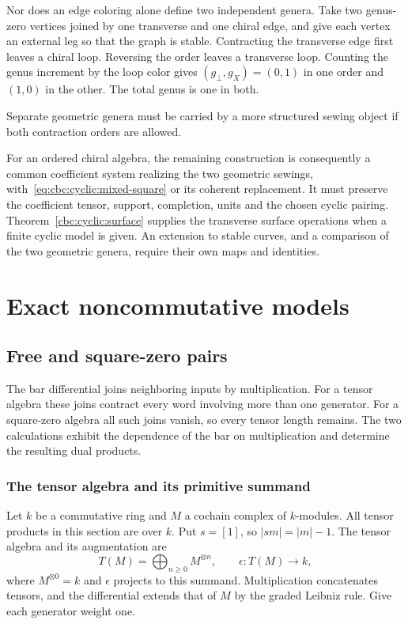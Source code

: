 Nor does an edge coloring alone define two independent genera.
Take two genus-zero vertices joined by one transverse and one chiral edge, and give each vertex an external leg so that the graph is stable.
Contracting the transverse edge first leaves a chiral loop.
Reversing the order leaves a transverse loop.
Counting the genus increment by the loop color gives $(g_\perp,g_X)=(0,1)$ in one order and $(1,0)$ in the other.
The total genus is one in both.

Separate geometric genera must be carried by a more structured sewing object if both contraction orders are allowed.

For an ordered chiral algebra, the remaining construction is consequently a common coefficient system realizing the two geometric sewings, with~\eqref{eq:cbc:cyclic:mixed-square} or its coherent replacement.
It must preserve the coefficient tensor, support, completion, units and the chosen cyclic pairing.
Theorem~\ref{cbc:cyclic:surface} supplies the transverse surface operations when a finite cyclic model is given.
An extension to stable curves, and a comparison of the two geometric genera, require their own maps and identities.

\part{Exact noncommutative models}

\chapter{Free and square-zero pairs}\label{chap:cbc:free-square-zero}
The bar differential joins neighboring inputs by multiplication.
For a tensor algebra these joins contract every word involving more than one generator.
For a square-zero algebra all such joins vanish, so every tensor length remains.
The two calculations exhibit the dependence of the bar on multiplication and determine the resulting dual products.

\section{The tensor algebra and its primitive summand}

Let $k$ be a commutative ring and $M$ a cochain complex of $k$-modules.
All tensor products in this section are over $k$.
Put $s=[1]$, so $|sm|=|m|-1$.
The tensor algebra and its augmentation are
\[
 T(M)=\bigoplus_{n\ge0}M^{\otimes n},\qquad
 \epsilon:T(M)\longrightarrow k,
\]
where $M^{\otimes0}=k$ and $\epsilon$ projects to this summand.
Multiplication concatenates tensors, and the differential extends that of $M$ by the graded Leibniz rule.
Give each generator weight one.

